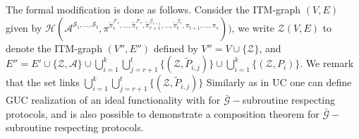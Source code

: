\documentclass{acm_proc_article-sp}
\begin{document}
The formal modification is done as follows. Consider the ITM-graph $(V, E)$ given by
$\mathcal{H}(
    \mathcal{A}^{\mathcal{S}_1, \ldots, \mathcal{S}_t},
    \pi^{
        \tilde{\pi}_1^{\mathcal{F}_1},
        \ldots,
        \tilde{\pi}_r^{\mathcal{F}_r},
        \tilde{\pi}_{r+1}^{
        \bar{\mathcal{G}}_{r+1}},
        \ldots,
        \tilde{\pi}_t^{\bar{\mathcal{G}}_t},
        \pi_{t+1},
        \ldots,
        \pi_s}))$,
we write $\mathcal{Z}(V, E)$ to denote the ITM-graph $(V'', E'')$ defined by $V'' = V \cup
\{\mathcal{Z}\}$, and $E'' = E' \cup \{\mathcal{Z}, \mathcal{A}\} \cup \bigcup_{i=1}^k
\bigcup_{j=r+1}^t \{(\mathcal{Z}, \tilde{P}_{i,j})\} \cup \bigcup_{i=1}^k \{(\mathcal{Z}, P_i)\}$.
We remark that the set links $\bigcup_{i=1}^k \bigcup_{j=r+1}^t \{(\mathcal{Z}, \tilde{P}_{i,j})\}$
Similarly as in UC one can define GUC realization of an ideal functionality with for
$\bar{\mathcal{G}}-$subroutine respecting protocols, and is also possible to demonstrate a composition
theorem for $\bar{\mathcal{G}}-$subroutine respecting protocols.
\end{document}
